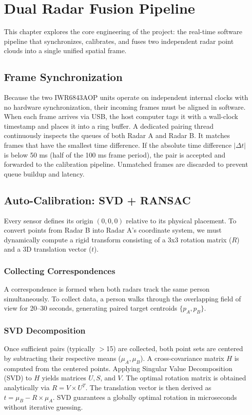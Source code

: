 \chapter{Dual Radar Fusion Pipeline}
This chapter explores the core engineering of the project: the real-time software pipeline that synchronizes, calibrates, and fuses two independent radar point clouds into a single unified spatial frame.

\section{Frame Synchronization}
Because the two IWR6843AOP units operate on independent internal clocks with no hardware synchronization, their incoming frames must be aligned in software. 
When each frame arrives via USB, the host computer tags it with a wall-clock timestamp and places it into a ring buffer. A dedicated pairing thread continuously inspects the queues of both Radar A and Radar B. It matches frames that have the smallest time difference. If the absolute time difference $|\Delta t|$ is below 50 ms (half of the 100 ms frame period), the pair is accepted and forwarded to the calibration pipeline. Unmatched frames are discarded to prevent queue buildup and latency.

\section{Auto-Calibration: SVD + RANSAC}
Every sensor defines its origin $(0,0,0)$ relative to its physical placement. To convert points from Radar B into Radar A's coordinate system, we must dynamically compute a rigid transform consisting of a 3x3 rotation matrix ($R$) and a 3D translation vector ($t$).

\subsection{Collecting Correspondences}
A correspondence is formed when both radars track the same person simultaneously. To collect data, a person walks through the overlapping field of view for 20–30 seconds, generating paired target centroids $\{p_A, p_B\}$. 

\subsection{SVD Decomposition}
Once sufficient pairs (typically $>$15) are collected, both point sets are centered by subtracting their respective means ($\mu_A, \mu_B$). A cross-covariance matrix $H$ is computed from the centered points. Applying Singular Value Decomposition (SVD) to $H$ yields matrices $U, S$, and $V$. The optimal rotation matrix is obtained analytically via $R = V \times U^T$. The translation vector is then derived as $t = \mu_B - R \times \mu_A$. SVD guarantees a globally optimal rotation in microseconds without iterative guessing.

